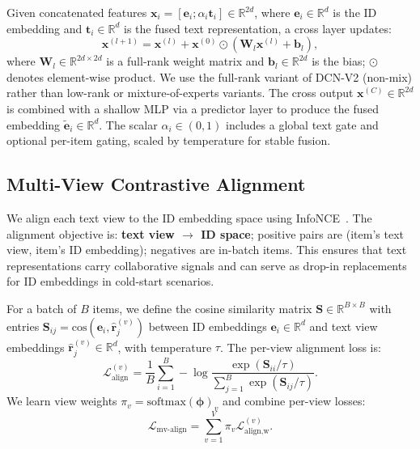 \documentclass[sigconf,natbib=true,anonymous]{acmart}
\newcommand{\InfoNCE}{InfoNCE\xspace}
\begin{document}
Given concatenated features
$\mathbf{x}_i=[\mathbf{e}_i;\alpha_i \mathbf{t}_i] \in \mathbb{R}^{2d}$, where
$\mathbf{e}_i \in \mathbb{R}^d$ is the ID embedding and $\mathbf{t}_i \in \mathbb{R}^d$ is the
fused text representation, a cross layer updates:
\begin{equation}
  \mathbf{x}^{(l+1)} = \mathbf{x}^{(l)} + \mathbf{x}^{(0)} \odot (\mathbf{W}_l\mathbf{x}^{(l)} + \mathbf{b}_l),
\end{equation}
where $\mathbf{W}_l \in \mathbb{R}^{2d \times 2d}$ is a
full-rank weight matrix and $\mathbf{b}_l \in \mathbb{R}^{2d}$ is the bias;
$\odot$ denotes element-wise product. We use the full-rank variant of DCN-V2 (non-mix)
rather than low-rank or mixture-of-experts variants. The
cross output $\mathbf{x}^{(C)} \in \mathbb{R}^{2d}$ is combined with a shallow MLP via a predictor
layer to produce the fused embedding $\tilde{\mathbf{e}}_i \in \mathbb{R}^d$.
The scalar $\alpha_i \in (0,1)$ includes a global text gate and
optional per-item gating, scaled by temperature for stable
fusion.

\subsection{Multi-View Contrastive Alignment}\label{sec:align}
We align each text view to the ID embedding space using
\InfoNCE~\cite{oord2018cpc}. The alignment objective is:
\textbf{text view $\to$ ID space}; positive pairs are
(item's text view, item's ID embedding); negatives are
in-batch items. This ensures that text representations
carry collaborative signals and can serve as drop-in
replacements for ID embeddings in cold-start scenarios.

For a batch of $B$ items, we define
the cosine similarity matrix
$\mathbf{S} \in \mathbb{R}^{B \times B}$ with entries
$\mathbf{S}_{ij} = \mathrm{cos}(\mathbf{e}_{i},
\hat{\mathbf{r}}_{j}^{(v)})$ between ID embeddings
$\mathbf{e}_i \in \mathbb{R}^d$ and text view embeddings
$\hat{\mathbf{r}}_j^{(v)} \in \mathbb{R}^d$, with temperature $\tau$.
The per-view alignment loss is:
\begin{equation}
  \mathcal{L}_{\text{align}}^{(v)} =
  \frac{1}{B}\sum_{i=1}^{B}
  -\log \frac{\exp(\mathbf{S}_{ii}/\tau)}{\sum_{j=1}^{B}\exp(\mathbf{S}_{ij}/\tau)}.
\end{equation}
We learn view weights $\pi_v=\mathrm{softmax}(\boldsymbol{\phi})_v$
and combine per-view losses:
\begin{equation}
  \mathcal{L}_{\text{mv-align}} = \sum_{v=1}^{V}\pi_v \mathcal{L}_{\text{align,w}}^{(v)}.
\end{equation}
\end{document}
